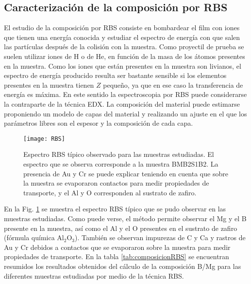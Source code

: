 \subsection{Caracterización de la composición por RBS}\label{SS:RBS}
El estudio de la composición por RBS consiste en bombardear el film con iones que tienen una energía conocida y estudiar el espectro de energía con que salen las partículas después de la colisión con la muestra. Como proyectil de prueba se suelen utilizar iones de H o de He, en función de la masa de los átomos presentes en la muestra. Como los iones que están presentes en la muestra son livianos, el espectro de energía producido resulta ser bastante sensible si los elementos presentes en la muestra tienen $Z$ pequeño, ya que en ese caso la transferencia de energía es máxima. En este sentido la espectroscopia por RBS puede considerarse la contraparte de la técnica EDX. La composición del material puede estimarse proponiendo un modelo de capas del material y realizando un ajuste en el que los parámetros libres son el espesor y la composición de cada capa.

 \begin{figure}[tbh!]
   \begin{center}
	 \texttt{[image: RBS]}
   \end{center}
   \caption[Espectro RBS típico observado para las muestras estudiadas.]{Espectro RBS típico observado para las muestras estudiadas. El espectro que se observa corresponde a la muestra BMB2S1B2. La presencia de Au y Cr se puede explicar teniendo en cuenta que sobre la muestra se evaporaron contactos para medir propiedades de transporte, y el Al y O corresponden al sustrato de zafiro.}
   \label{fig:RBS}
 \end{figure}

 En la Fig. \ref{fig:RBS} se muestra el espectro RBS típico que se pudo observar en las muestras estudiadas. Como puede verse, el método permite observar el Mg y el B presente en la muestra, así como el Al y el O presentes en el sustrato de zafiro (fórmula química Al$_2$O$_{3}$). También se observan impurezas de C y Ca y rastros de Au y Cr debidos a contactos que se evaporaron sobre la muestra para medir propiedades de transporte. En la tabla \ref{tab:composicionRBS} se encuentran resumidos los resultados obtenidos del cálculo de la composición B/Mg para las diferentes muestras estudiadas por medio de la téc\-ni\-ca RBS.

